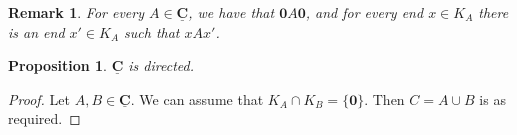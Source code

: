 \documentclass[12pt]{amsart}
\numberwithin{equation}{section}
\theoremstyle{plain}
\newtheorem{remark}[theorem]{\bf Remark}
\newtheorem{proposition}[theorem]{\bf Proposition}
\theoremstyle{definition}
\newcommand \sqsp{\sqsupset}
\newcommand \sqsb{\sqsubset}
\newcommand \rt{\mathbf{0}}
\newcommand \fra{Fra\"{i}ss\'{e}}
\newcommand \CCb{\mathbf{C}}
\newcommand \IIb{\mathbf{I}}
\newcommand \LLb{\mathbf{L}}
\newcommand \CCub{\underline{\mathbf{C}}}
\begin{document}

 

\begin{remark}
For every $A \in \CCub$, we have that $\rt A \rt$, and for every end $x \in K_A$ there is an end $x' \in K_A$ such that $x A x'$.
\end{remark}  
 
\begin{proposition}
\label{pr:FAnDirected}
$\CCub$ is directed.
\end{proposition}

\begin{proof}
Let $A,B \in \CCub$. We can assume that $K_A \cap K_B=\{\rt\}$. Then $C=A \cup B$ is as required.
\end{proof}
\end{document}
